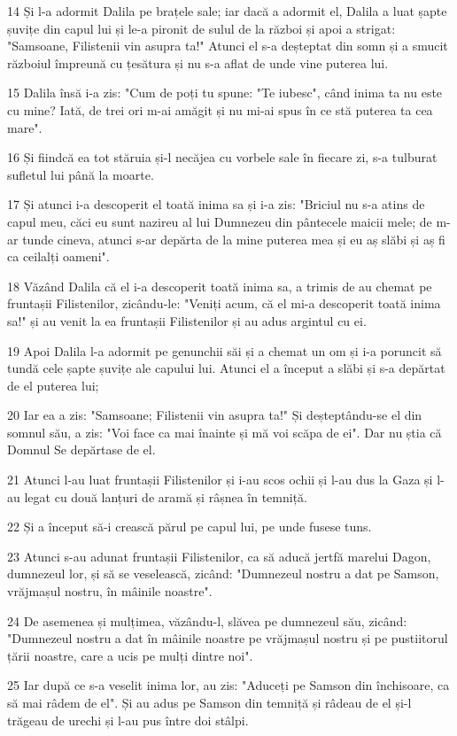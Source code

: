 \par 14 Și l-a adormit Dalila pe brațele sale; iar dacă a adormit el, Dalila a luat șapte șuvițe din capul lui și le-a pironit de sulul de la război și apoi a strigat: "Samsoane, Filistenii vin asupra ta!" Atunci el s-a deșteptat din somn și a smucit războiul împreună cu țesătura și nu s-a aflat de unde vine puterea lui.
\par 15 Dalila însă i-a zis: "Cum de poți tu spune: "Te iubesc", când inima ta nu este cu mine? Iată, de trei ori m-ai amăgit și nu mi-ai spus în ce stă puterea ta cea mare".
\par 16 Și fiindcă ea tot stăruia și-l necăjea cu vorbele sale în fiecare zi, s-a tulburat sufletul lui până la moarte.
\par 17 Și atunci i-a descoperit el toată inima sa și i-a zis: "Briciul nu s-a atins de capul meu, căci eu sunt nazireu al lui Dumnezeu din pântecele maicii mele; de m-ar tunde cineva, atunci s-ar depărta de la mine puterea mea și eu aș slăbi și aș fi ca ceilalți oameni".
\par 18 Văzând Dalila că el i-a descoperit toată inima sa, a trimis de au chemat pe fruntașii Filistenilor, zicându-le: "Veniți acum, că el mi-a descoperit toată inima sa!" și au venit la ea fruntașii Filistenilor și au adus argintul cu ei.
\par 19 Apoi Dalila l-a adormit pe genunchii săi și a chemat un om și i-a poruncit să tundă cele șapte șuvițe ale capului lui. Atunci el a început a slăbi și s-a depărtat de el puterea lui;
\par 20 Iar ea a zis: "Samsoane; Filistenii vin asupra ta!" Și deșteptându-se el din somnul său, a zis: "Voi face ca mai înainte și mă voi scăpa de ei". Dar nu știa că Domnul Se depărtase de el.
\par 21 Atunci l-au luat fruntașii Filistenilor și i-au scos ochii și l-au dus la Gaza și l-au legat cu două lanțuri de aramă și râșnea în temniță.
\par 22 Și a început să-i crească părul pe capul lui, pe unde fusese tuns.
\par 23 Atunci s-au adunat fruntașii Filistenilor, ca să aducă jertfă marelui Dagon, dumnezeul lor, și să se veselească, zicând: "Dumnezeul nostru a dat pe Samson, vrăjmașul nostru, în mâinile noastre".
\par 24 De asemenea și mulțimea, văzându-l, slăvea pe dumnezeul său, zicând: "Dumnezeul nostru a dat în mâinile noastre pe vrăjmașul nostru și pe pustiitorul țării noastre, care a ucis pe mulți dintre noi".
\par 25 Iar după ce s-a veselit inima lor, au zis: "Aduceți pe Samson din închisoare, ca să mai râdem de el". Și au adus pe Samson din temniță și râdeau de el și-l trăgeau de urechi și l-au pus între doi stâlpi.
